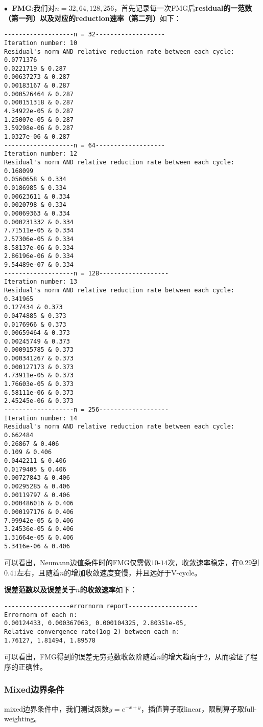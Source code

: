 \documentclass{ctexart}
\begin{document}
\begin{sloppypar}
$\bullet \;$ \textbf{FMG}:我们对$n=32,64,128,256$，首先记录每一次FMG后\textbf{residual的一范数（第一列）以及对应的reduction速率（第二列）}如下：
\begin{shaded}
\begin{verbatim}
-------------------n = 32-------------------
Iteration number: 10
Residual's norm AND relative reduction rate between each cycle: 
0.0771376
0.0221719 & 0.287
0.00637273 & 0.287
0.00183167 & 0.287
0.000526464 & 0.287
0.000151318 & 0.287
4.34922e-05 & 0.287
1.25007e-05 & 0.287
3.59298e-06 & 0.287
1.0327e-06 & 0.287
-------------------n = 64-------------------
Iteration number: 12
Residual's norm AND relative reduction rate between each cycle: 
0.168099
0.0560658 & 0.334
0.0186985 & 0.334
0.00623611 & 0.334
0.0020798 & 0.334
0.00069363 & 0.334
0.000231332 & 0.334
7.71511e-05 & 0.334
2.57306e-05 & 0.334
8.58137e-06 & 0.334
2.86196e-06 & 0.334
9.54489e-07 & 0.334
-------------------n = 128-------------------
Iteration number: 13
Residual's norm AND relative reduction rate between each cycle: 
0.341965
0.127434 & 0.373
0.0474885 & 0.373
0.0176966 & 0.373
0.00659464 & 0.373
0.00245749 & 0.373
0.000915785 & 0.373
0.000341267 & 0.373
0.000127173 & 0.373
4.73911e-05 & 0.373
1.76603e-05 & 0.373
6.58111e-06 & 0.373
2.45245e-06 & 0.373
-------------------n = 256-------------------
Iteration number: 14
Residual's norm AND relative reduction rate between each cycle: 
0.662484
0.26867 & 0.406
0.109 & 0.406
0.0442211 & 0.406
0.0179405 & 0.406
0.00727843 & 0.406
0.00295285 & 0.406
0.00119797 & 0.406
0.000486016 & 0.406
0.000197176 & 0.406
7.99942e-05 & 0.406
3.24536e-05 & 0.406
1.31664e-05 & 0.406
5.3416e-06 & 0.406
\end{verbatim}
\end{shaded}
可以看出，Neumann边值条件时的FMG仅需做$10$-$14$次，收敛速率稳定，在$0.29$到$0.41$左右，且随着$n$的增加收敛速度变慢，并且远好于V-cycle。

\textbf{误差范数以及误差关于$n$的收敛速率}如下：
\begin{shaded}
\begin{verbatim}
------------------errornorm report-------------------
Errornorm of each n: 
0.00124433, 0.000367063, 0.000104325, 2.80351e-05, 
Relative convergence rate(1og 2) between each n: 
1.76127, 1.81494, 1.89578
\end{verbatim} 
\end{shaded}
可以看出，FMG得到的误差无穷范数收敛阶随着$n$的增大趋向于$2$，从而验证了程序的正确性。

\subsubsection{Mixed边界条件}
mixed边界条件中，我们测试函数$y=e^{-x+y}$，插值算子取linear，限制算子取full-weighting。


\end{sloppypar}
\end{document}
